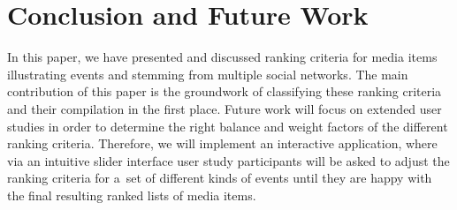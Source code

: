 \documentclass[runningheads,a4paper,11pt]{llncs}
\begin{document}
\section{Conclusion and Future Work}
In this paper, we have presented and discussed ranking criteria for media items
illustrating events and stemming from multiple social networks.
The main contribution of this paper is the groundwork of classifying these ranking criteria
and their compilation in the first place.
Future work will focus on extended user studies in order to determine the right balance
and weight factors of the different ranking criteria.
Therefore, we will implement an interactive application,
where via an intuitive slider interface user study participants will be asked
to adjust the ranking criteria for a~set of different kinds of events
until they are happy with the final resulting ranked lists of media items.

\renewcommand{\ttdefault}{cmvtt}
\renewcommand\UrlFont\tt



\end{document}
